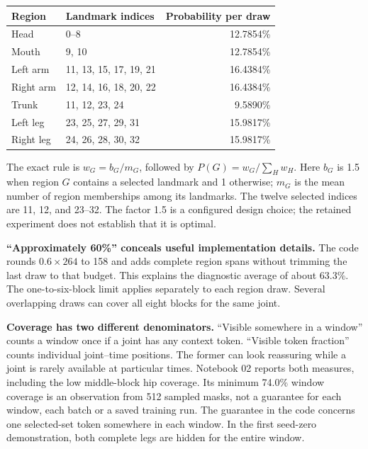 \documentclass[
  11pt,
]{article}
\newcounter{none} %
\begin{document}
{\def\LTcaptype{none} %
\begin{longtable}[]{@{}llr@{}}
\toprule\noalign{}
Region & Landmark indices & Probability per draw \\
\midrule\noalign{}
\endhead
\bottomrule\noalign{}
\endlastfoot
Head & 0--8 & 12.7854\% \\
Mouth & 9, 10 & 12.7854\% \\
Left arm & 11, 13, 15, 17, 19, 21 & 16.4384\% \\
Right arm & 12, 14, 16, 18, 20, 22 & 16.4384\% \\
Trunk & 11, 12, 23, 24 & 9.5890\% \\
Left leg & 23, 25, 27, 29, 31 & 15.9817\% \\
Right leg & 24, 26, 28, 30, 32 & 15.9817\% \\
\end{longtable}
}

The exact rule is \(w_G=b_G/m_G\), followed by \(P(G)=w_G/\sum_H w_H\).
Here \(b_G\) is 1.5 when region \(G\) contains a selected landmark and 1
otherwise; \(m_G\) is the mean number of region memberships among its
landmarks. The twelve selected indices are 11, 12, and 23--32. The
factor 1.5 is a configured design choice; the retained experiment does
not establish that it is optimal.

\textbf{``Approximately 60\%'' conceals useful implementation details.}
The code rounds \(0.6\times264\) to 158 and adds complete region spans
without trimming the last draw to that budget. This explains the
diagnostic average of about 63.3\%. The one-to-six-block limit applies
separately to each region draw. Several overlapping draws can cover all
eight blocks for the same joint.

\textbf{Coverage has two different denominators.} ``Visible somewhere in
a window'' counts a window once if a joint has any context token.
``Visible token fraction'' counts individual joint--time positions. The
former can look reassuring while a joint is rarely available at
particular times. Notebook 02 reports both measures, including the low
middle-block hip coverage. Its minimum 74.0\% window coverage is an
observation from 512 sampled masks, not a guarantee for each window,
each batch or a saved training run. The guarantee in the code concerns
one selected-set token somewhere in each window. In the first seed-zero
demonstration, both complete legs are hidden for the entire window.
\end{document}
